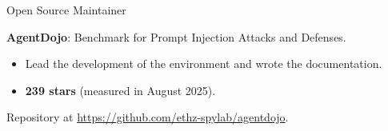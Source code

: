 \begin{cventries}
\cventry
{Open Source Maintainer} %
{} %
{} %
{} %
{
    \begin{cvitems} %
        \item{\textbf{AgentDojo}: Benchmark for Prompt Injection Attacks and Defenses.
            \begin{itemize}
                \item Lead the development of the environment and wrote the documentation.
                \item \textbf{239 stars} (measured in August 2025).
            \end{itemize}
            Repository at \url{https://github.com/ethz-spylab/agentdojo}.}
    \end{cvitems}
}



\end{cventries}
